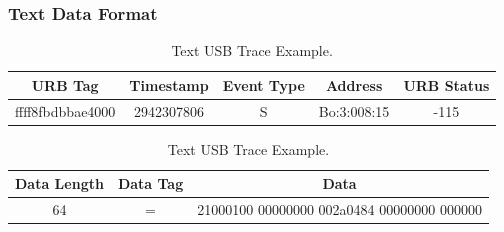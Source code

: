 \subsubsection{Text Data Format}
\begin{table}[h!]
\centering
\begin{tabular}{|c|c|c|c|c|}
\hline
URB Tag & Timestamp & Event Type & Address & URB Status\\
\hline
ffff8fbdbbae4000 & 2942307806 & S & Bo:3:008:15 & -115\\ 
\hline
\end{tabular}
\begin{tabular}{|c|c|c|}
\hline
Data Length & Data Tag & Data\\
\hline
64 & = & 21000100 00000000 002a0484 00000000 000000\\
\hline
\end{tabular}
\caption{Text USB Trace Example.}
\end{table}

